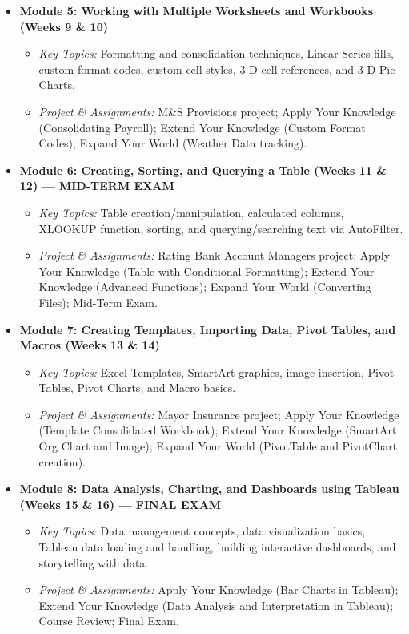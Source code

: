 \documentclass[11pt,a4paper]{article}
\begin{document}
\begin{itemize}[leftmargin=*]
    \item \textbf{Module 5: Working with Multiple Worksheets and Workbooks (Weeks 9 \& 10)}
    \begin{itemize}
        \item \textit{Key Topics:} Formatting and consolidation techniques, Linear Series fills, custom format codes, custom cell styles, 3-D cell references, and 3-D Pie Charts.
        \item \textit{Project \& Assignments:} M\&S Provisions project; Apply Your Knowledge (Consolidating Payroll); Extend Your Knowledge (Custom Format Codes); Expand Your World (Weather Data tracking).
    \end{itemize}

    \item \textbf{Module 6: Creating, Sorting, and Querying a Table (Weeks 11 \& 12) --- MID-TERM EXAM}
    \begin{itemize}
        \item \textit{Key Topics:} Table creation/manipulation, calculated columns, XLOOKUP function, sorting, and querying/searching text via AutoFilter.
        \item \textit{Project \& Assignments:} Rating Bank Account Managers project; Apply Your Knowledge (Table with Conditional Formatting); Extend Your Knowledge (Advanced Functions); Expand Your World (Converting Files); Mid-Term Exam.
    \end{itemize}

    \item \textbf{Module 7: Creating Templates, Importing Data, Pivot Tables, and Macros (Weeks 13 \& 14)}
    \begin{itemize}
        \item \textit{Key Topics:} Excel Templates, SmartArt graphics, image insertion, Pivot Tables, Pivot Charts, and Macro basics.
        \item \textit{Project \& Assignments:} Mayor Insurance project; Apply Your Knowledge (Template Consolidated Workbook); Extend Your Knowledge (SmartArt Org Chart and Image); Expand Your World (PivotTable and PivotChart creation).
    \end{itemize}

    \item \textbf{Module 8: Data Analysis, Charting, and Dashboards using Tableau (Weeks 15 \& 16) --- FINAL EXAM}
    \begin{itemize}
        \item \textit{Key Topics:} Data management concepts, data visualization basics, Tableau data loading and handling, building interactive dashboards, and storytelling with data.
        \item \textit{Project \& Assignments:} Apply Your Knowledge (Bar Charts in Tableau); Extend Your Knowledge (Data Analysis and Interpretation in Tableau); Course Review; Final Exam.
    \end{itemize}
\end{itemize}
\end{document}
